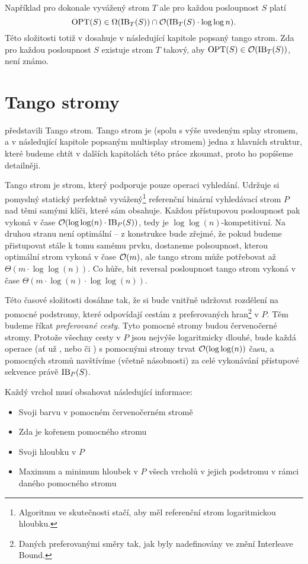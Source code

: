 Například pro dokonale vyvážený strom $T$ ale pro každou posloupnost $S$ platí $$\operatorname{OPT}(S) \in \Omega(\operatorname{IB}_T(S)) \cap \mathcal O(\operatorname{IB}_T(S)\cdot\log\log n).$$ Této složitosti totiž v dosahuje v následující kapitole popsaný tango strom.
Zda pro každou posloupnost $S$ existuje
strom $T$ takový, aby $\operatorname{OPT}(S)\in\mathcal O(\operatorname{IB}_T(S))$, není známo.  

\section{Tango stromy}\label{sec:tango}

\citet{tango} představili Tango strom. Tango strom je (spolu s výše uvedeným splay stromem, a v následující kapitole popsaným multisplay stromem) jedna z hlavních struktur, které budeme chtít v dalších kapitolách této práce zkoumat, proto ho popíšeme detailněji.

Tango strom je strom, který podporuje pouze operaci vyhledání. Udržuje si
pomyslný statický perfektně vyvážený\footnote{Algoritmu ve skutečnosti stačí,
aby měl referenční strom logaritmickou hloubku.} referenční binární vyhledávací
strom $P$ nad těmi samými klíči, které sám obsahuje. Každou přístupovou
posloupnost pak vykoná v čase $\mathcal O(\log\log(n)\cdot \operatorname{IB}_P(S))$, tedy je
$\log\log(n)$-kompetitivní. Na druhou stranu není optimální -- z konstrukce
bude zřejmé, že pokud budeme přistupovat stále k tomu samému prvku, dostaneme polsoupnost, kterou optimální strom
 vykoná v čase $\mathcal O(m)$, ale tango strom může potřebovat až
$\Theta(m\cdot\log\log(n))$. Co hůře, bit reversal posloupnost tango strom vykoná v čase $\Theta(m\cdot\log(n)\cdot \log\log(n))$.

Této časové složitosti dosáhne tak, že si bude vnitřně udržovat rozdělení na
pomocné podstromy, které odpovídají cestám z preferovaných hran\footnote{Daných
preferovanými směry tak, jak byly nadefinovány ve znění Interleave Bound.} v
$P$. Těm budeme říkat \emph{preferované cesty}. Tyto pomocné stromy budou červenočerné stromy. Protože všechny cesty v $P$
jsou nejvýše logaritmicky dlouhé, bude každá operace (ať už , nebo 
či ) s pomocnými stromy trvat $\mathcal O(\log\log(n))$ času, a pomocných stromů
navštívíme (včetně násobnosti) za celé vykonávání přístupové sekvence právě
$\operatorname{IB}_P(S)$.

Každý vrchol musí obsahovat následující informace:
\begin{itemize}
\item Svoji barvu v pomocném červenočerném stromě
\item Zda je kořenem pomocného stromu
\item Svoji hloubku v $P$
\item Maximum a minimum hloubek v $P$ všech vrcholů v jejich podstromu v rámci daného pomocného stromu
\end{itemize}


